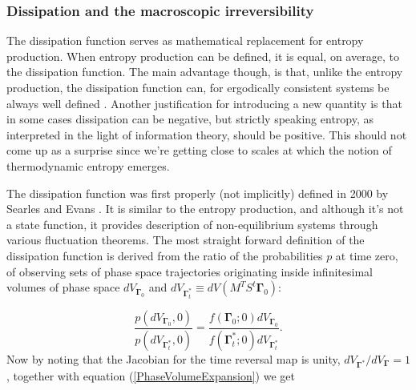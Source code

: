 \documentclass[a4paper,12pt]{article}
\begin{document}

\subsubsection{Dissipation and the macroscopic irreversibility}

The dissipation function serves as mathematical replacement for entropy production. When entropy production can be defined, it is equal, on average, to the dissipation function. The main advantage though, is that, unlike the entropy production, the dissipation function can, for ergodically consistent systems be always well defined \cite{Evans:2241458}. Another justification for introducing a new quantity is that in some cases dissipation can be negative, but strictly speaking entropy, as interpreted in the light of information theory, should be positive. This should not come up as a surprise since we're getting close to scales at which the notion of thermodynamic entropy emerges. 

%

The dissipation function was first properly (not implicitly) defined in 2000 by Searles and Evans \cite{Searles:2000ig}. It is similar to the entropy production, and although it's not a state function, it provides description of non-equilibrium systems through various fluctuation theorems.
The most straight forward definition of the dissipation function is derived from the ratio of the probabilities $p$ at time zero, of observing sets of phase space trajectories originating inside infinitesimal volumes of phase space $dV_{\bm{\Gamma}_0}$ and $dV_{\bm{\Gamma}_t^*}\equiv d V(M^T S^t \bm{\Gamma}_0)$:

\begin{equation}
\label{ReversibilityEvans}
  \frac{p(d V_{\bm{\Gamma}_0}, 0)}{p(d V_{\bm{\Gamma}_t^*},0)}= 
  \frac{f(\bm{\Gamma}_0;0)d V_{\bm{\Gamma}_0}}{f(\bm{\Gamma}_t^*;0)d V_{\bm{\Gamma}_t^*}}.
\end{equation}
Now by noting that the Jacobian for the time reversal map is unity, $ d V_{\bm{\Gamma}^*}/ d V_{\bm{\Gamma}} =1 $, together with equation (\ref{PhaseVolumeExpansion}) we get
\end{document}
